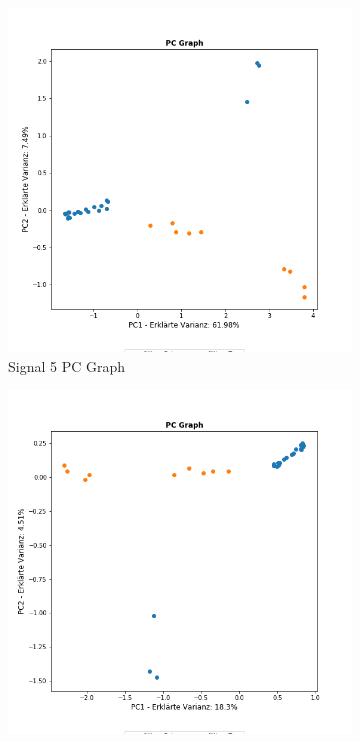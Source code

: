 \begin{figure}
\centering
\begin{subfigure}{0.45\textwidth}
\centering
\includegraphics[width = \textwidth]{figures/Signal_5_pc_graph.png}
\caption{Signal 5 PC Graph}
\label{sparse_pca_classical_analysis_pc_graph}
\end{subfigure}
%
\begin{subfigure}{0.45\textwidth}
\centering
\includegraphics[width = \textwidth]{figures/Signal_5_sparse_pc_graph.png}

\end{subfigure}
\end{figure}
